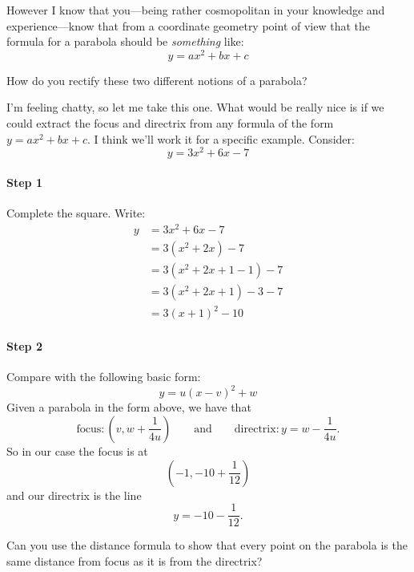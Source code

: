 However I know that you---being rather cosmopolitan in your knowledge
and experience---know that from a coordinate geometry point of view
that the formula for a parabola should be \textit{something} like:
\[
y = ax^2 + bx + c
\]
\begin{question}
How do you rectify these two different notions of a parabola?
\end{question}
I'm feeling chatty, so let me take this one. What would be really nice
is if we could extract the focus and directrix from any formula of the
form $y = ax^2 + bx + c$. I think we'll work it for a specific
example. Consider:
\[
y = 3x^2 + 6x - 7
\]
\paragraph{Step 1} Complete the square. Write:
\begin{align*}
y &= 3x^2 + 6x -7 \\
 &= 3(x^2 + 2x) -7 \\ 
 &= 3(x^2 + 2x + 1 - 1) -7 \\
 &= 3(x^2 + 2x + 1) - 3 -7\\ 
 &= 3(x + 1)^2 - 10
\end{align*}


\paragraph{Step 2} Compare with the following basic form:
\[
y = u(x-v)^2 +w 
\]
Given a parabola in the form above, we have that
\[
\text{focus}:\left(v, w+\frac{1}{4u}\right) \qquad\text{and}\qquad \text{directrix}:y = w - \frac{1}{4u}.
\]
So in our case the focus is at 
\[
\left(-1, -10 + \frac{1}{12}\right)
\]
and our directrix is the line
\[
y = -10-\frac{1}{12}.
\]

\begin{question} 
Can you use the distance formula to show that every point on the
parabola is the same distance from focus as it is from the directrix?
\end{question}
\QM




